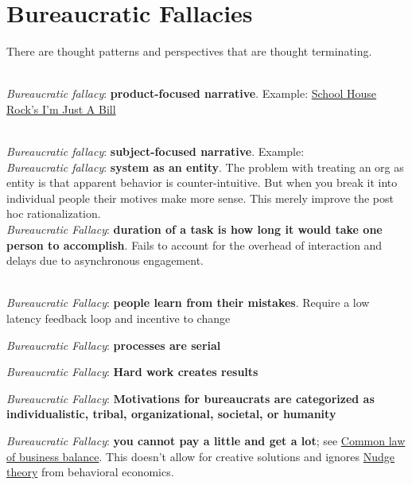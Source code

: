 \section{Bureaucratic Fallacies\label{sec:fallacies}}

There are thought patterns and perspectives that are \gls{thought terminating}. 

\ \\

\textit{Bureaucratic fallacy}: \textbf{product-focused narrative}. Example: \href{https://www.youtube.com/watch?v=OgVKvqTItto}{School House Rock's I'm Just A Bill}

\ \\

\textit{Bureaucratic fallacy}: \textbf{subject-focused narrative}. Example: 
\ \\

\textit{Bureaucratic fallacy}: \textbf{system as an entity}. \cite{2002_Gall}
The problem with treating an org as entity is that apparent behavior is counter-intuitive. But when you break it into individual people their motives make more sense. This merely improve the post hoc rationalization. 
\ \\

\textit{Bureaucratic Fallacy}: \textbf{duration of a task is how long it would take one person to accomplish}. Fails to account for the overhead of interaction and delays due to asynchronous engagement.

\ \\

\textit{Bureaucratic Fallacy}: \textbf{people learn from their mistakes}. Require a low latency feedback loop and incentive to change

\textit{Bureaucratic Fallacy}: \textbf{processes are serial}


\textit{Bureaucratic Fallacy}: \textbf{Hard work creates results}

\textit{Bureaucratic Fallacy}: \textbf{Motivations for bureaucrats are categorized as individualistic, tribal, organizational, societal, or humanity}


\textit{Bureaucratic Fallacy}: \textbf{you cannot pay a little and get a lot}; see \href{https://en.wikipedia.org/wiki/Common_law_of_business_balance}{Common law of business balance}. 
This doesn't allow for creative solutions and ignores \href{https://en.wikipedia.org/wiki/Nudge_theory}{Nudge theory} from behavioral economics. 